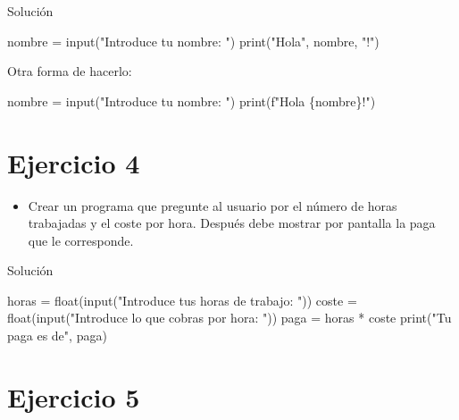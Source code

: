 \documentclass[
  a4paper,
  DIV=11,
  numbers=noendperiod,
  onepage,
  openany]{scrreprt}
\newenvironment{Shaded}{\begin{snugshade}}{\end{snugshade}}
\newcommand{\BuiltInTok}[1]{\textcolor[rgb]{0.00,0.23,0.31}{#1}}
\newcommand{\NormalTok}[1]{\textcolor[rgb]{0.00,0.23,0.31}{#1}}
\newcommand{\OperatorTok}[1]{\textcolor[rgb]{0.37,0.37,0.37}{#1}}
\newcommand{\SpecialCharTok}[1]{\textcolor[rgb]{0.37,0.37,0.37}{#1}}
\newcommand{\SpecialStringTok}[1]{\textcolor[rgb]{0.13,0.47,0.30}{#1}}
\newcommand{\StringTok}[1]{\textcolor[rgb]{0.13,0.47,0.30}{#1}}
\providecommand{\tightlist}{%
  \setlength{\itemsep}{0pt}\setlength{\parskip}{0pt}}\usepackage{longtable,booktabs,array}
\begin{document}
Solución

\begin{Shaded}
\begin{Highlighting}[]
\NormalTok{nombre }\OperatorTok{=} \BuiltInTok{input}\NormalTok{(}\StringTok{"Introduce tu nombre: "}\NormalTok{)}
\BuiltInTok{print}\NormalTok{(}\StringTok{"Hola"}\NormalTok{, nombre, }\StringTok{"!"}\NormalTok{)}
\end{Highlighting}
\end{Shaded}

Otra forma de hacerlo:

\begin{Shaded}
\begin{Highlighting}[]
\NormalTok{nombre }\OperatorTok{=} \BuiltInTok{input}\NormalTok{(}\StringTok{"Introduce tu nombre: "}\NormalTok{)}
\BuiltInTok{print}\NormalTok{(}\SpecialStringTok{f"Hola }\SpecialCharTok{\{}\NormalTok{nombre}\SpecialCharTok{\}}\SpecialStringTok{!"}\NormalTok{)}
\end{Highlighting}
\end{Shaded}

\section{Ejercicio 4}\label{ejercicio-4-1}

\begin{itemize}
\tightlist
\item
  Crear un programa que pregunte al usuario por el número de horas
  trabajadas y el coste por hora. Después debe mostrar por pantalla la
  paga que le corresponde.
\end{itemize}

Solución

\begin{Shaded}
\begin{Highlighting}[]
\NormalTok{horas }\OperatorTok{=} \BuiltInTok{float}\NormalTok{(}\BuiltInTok{input}\NormalTok{(}\StringTok{"Introduce tus horas de trabajo: "}\NormalTok{))}
\NormalTok{coste }\OperatorTok{=} \BuiltInTok{float}\NormalTok{(}\BuiltInTok{input}\NormalTok{(}\StringTok{"Introduce lo que cobras por hora: "}\NormalTok{))}
\NormalTok{paga }\OperatorTok{=}\NormalTok{ horas }\OperatorTok{*}\NormalTok{ coste}
\BuiltInTok{print}\NormalTok{(}\StringTok{"Tu paga es de"}\NormalTok{, paga)}
\end{Highlighting}
\end{Shaded}

\section{Ejercicio 5}\label{ejercicio-5-1}
\end{document}
